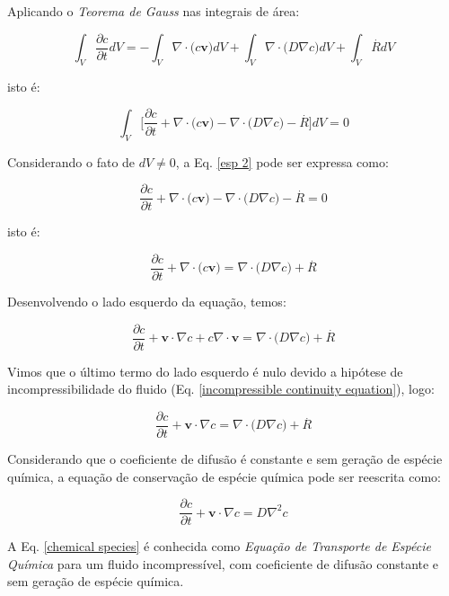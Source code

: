 \medskip
\noindent
Aplicando o \textit{Teorema de Gauss} nas integrais
de área:

\begin{equation}
 \int_{V} \frac{\partial c}{\partial t} dV
 = 
 - 
 \int_{V} \nabla \cdot \big( c \textbf{v} \big) dV
 +
 \int_{V} \nabla \cdot \big( D \nabla c \big) dV
 +
 \int_{V} \overset{.}{R} dV
\end{equation}

\medskip
\noindent
isto é:

\begin{equation} \label{esp 2}
 \int_{V} \Bigg[ \frac{\partial c}{\partial t}
 + 
 \nabla \cdot \big( c \textbf{v} \big)
 -
 \nabla \cdot \big( D \nabla c \big)
 -
 \overset{.}{R} \Bigg] dV = 0
\end{equation}



\medskip
\noindent
Considerando o fato de $dV \neq 0$,
a Eq. \ref{esp 2} pode ser expressa como:

\begin{equation}
 \frac{\partial c}{\partial t}
 + 
 \nabla \cdot \big( c \textbf{v} \big)
 -
 \nabla \cdot \big( D \nabla c \big)
 -
 \overset{.}{R} = 0
\end{equation}



\medskip
\noindent
isto é:

\begin{equation}
 \frac{\partial c}{\partial t}
 +
 \nabla \cdot \big( c \textbf{v} \big)
 =
 \nabla \cdot \big( D \nabla c \big)
 +
 \overset{.}{R}
\end{equation}

\medskip
\noindent
Desenvolvendo o lado esquerdo da equação, temos:

\begin{equation}
 \frac{\partial c}{\partial t}
 +
 \textbf{v} \cdot \nabla c
 + 
 c \nabla \cdot \textbf{v}
 =
 \nabla \cdot \big( D \nabla c \big)
 +
 \overset{.}{R}
\end{equation}

\medskip
Vimos que o último termo do lado esquerdo
é nulo devido a hipótese de incompressibilidade
do fluido (Eq. \ref{incompressible continuity equation}),
logo:

\begin{equation}
 \frac{\partial c}{\partial t}
 +
 \textbf{v} \cdot \nabla c
 =
 \nabla \cdot \big( D \nabla c \big)
 +
 \overset{.}{R}
\end{equation}

\newpage
Considerando que o coeficiente de 
difusão é constante e sem geração de
espécie química, 
a equação de conservação de espécie química
pode ser reescrita como:

\begin{equation} \label{chemical species}
 \frac{\partial c}{\partial t}
 +
 \textbf{v} \cdot \nabla c
 =
 D \nabla^{2} c
\end{equation}

\medskip
\noindent
A Eq. \ref{chemical species} é conhecida como 
\textit{Equação de Transporte de Espécie Química}
para um fluido incompressível, com coeficiente
de difusão constante e sem geração de espécie
química.
